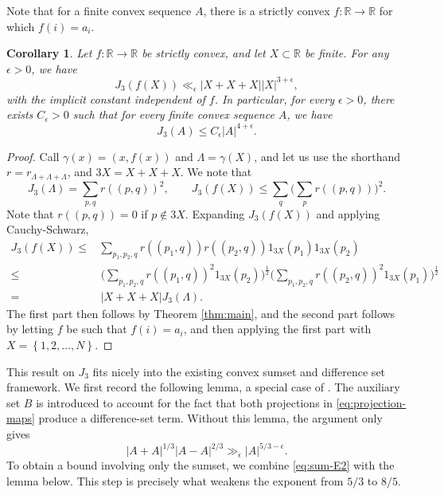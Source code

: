 \documentclass{amsart}
\numberwithin{equation}{section}
\newtheorem{corollary}[theorem]{Corollary}
\newcommand{\e}{\epsilon}
\begin{document}
Note that for a finite convex sequence $A$, there is a strictly convex \(f : \mathbb{R} \to \mathbb{R} \) for which \(f(i) = a_{i} \).  

\begin{corollary}\label{cor:convex-sequence-j3}
    Let \(f: \mathbb{R} \to \mathbb{R} \) be strictly convex, and let \(X \subset  \mathbb{R} \) be finite.
    For any \(\e > 0\), we have
    \[
    J_3(f(X)) \ll _{\e}  \left\lvert X + X + X \right\rvert \left\lvert X \right\rvert ^{3 + \e}
    ,\]
    with the implicit constant independent of \(f\). 
    In particular, for every \(\e > 0\), there exists $C_\e>0$ such that for every finite convex sequence \(A\), we have
    \[
    J_3(A) \leq C_{\e} \left\lvert A \right\rvert ^{4 + \e}.
    \]
\end{corollary}

\begin{proof}
    Call \(\gamma(x) = (x,f(x))\) and \(\Lambda = \gamma(X)\), and let us use the shorthand \(r = r_{\Lambda+\Lambda+\Lambda} \), and \(3X = X+X+X\). We note that
    \[
    J_3(\Lambda) = \sum _{p,q} r ((p,q))^{2}, \qquad J_3(f(X)) \leq \sum _{q} \Big( \sum _{p} r((p,q)) \Big) ^{2}
    .\]
    Note that \(r((p,q)) = 0\) if \(p \not  \in 3X\). 
    Expanding \(J_3(f(X))\) and applying Cauchy-Schwarz, 
    \begin{align*}
        J_3(f(X)) \leq& \sum _{p_1,p_2,q}  r((p_1,q))r((p_2,q)) 1_{3X} (p_1) 1_{3X} (p_2) \\
        \leq&\, \Big( \sum _{p_1,p_2,q} r((p_1,q))^{2} 1_{3X} (p_2) \Big) ^{\frac{1}{2} } \Big( \sum _{p_1,p_2,q} r((p_2,q))^{2} 1_{3X} (p_1) \Big) ^{\frac{1}{2} }\\
        = & \,
        \left\lvert X+X+X \right\rvert J_3(\Lambda).
    \end{align*} 
    The first part then follows by Theorem \ref{thm:main}, and the second part follows by letting \(f\) be such that \(f(i) = a_{i} \), and then applying the first part with \(X = \left\{ 1,2, \ldots , N \right\} \).
    \qedhere
    
\end{proof}


\medskip 

This result on \(J_3\) fits nicely into the existing convex sumset and difference set framework. 
We first record the following lemma, a special case of \cite[Lemma 4]{Rudnev-Stevens}. 
The auxiliary set \(B\) is introduced to account for the fact that both projections in \eqref{eq:projection-maps} produce a difference-set term. 
Without this lemma, the argument only gives
\[
|A+A|^{1/3}|A-A|^{2/3}
\gg_{\e}
|A|^{5/3-\e}.
\]
To obtain a bound involving only the sumset, we combine \eqref{eq:sum-E2} with the lemma below. 
This step is precisely what weakens the exponent from \(5/3\) 
to \(8/5\).
\end{document}

